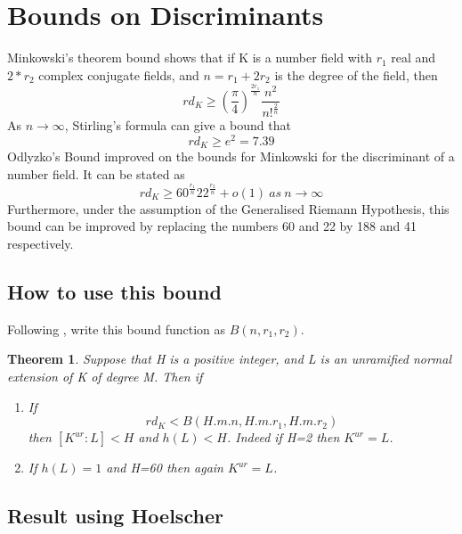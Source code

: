 \documentclass[preprint,12pt,reqno]{elsarticle}
\newtheorem{theorem}{Theorem}
\begin{document}
\section{Bounds on Discriminants}
Minkowski's theorem bound shows that if K is a number field with $r_1$ real and $2*r_2$ complex conjugate fields, and $n=r_1+2r_2$ is the degree of the field, then 
\begin{equation}
rd_K\geqslant (\frac{\pi}{4})^{\frac{2r_1}{n}}\frac{n^2}{n!^{\frac{2}{n}}}
\end{equation} 
As $n\rightarrow \infty$, Stirling's formula can give a bound that
\begin{equation}
    rd_K\geqslant e^2 = 7.39
\end{equation}
Odlyzko's Bound \cite{ODL2} improved on the bounds for Minkowski for the discriminant of a number field. It can be stated as  
\begin{equation}
rd_K\geqslant 60^{\frac{r_1}{n}}22^{\frac{r_2}{n}}+o(1)\:as\:n\rightarrow \infty   
\end{equation}
Furthermore, under the assumption of the Generalised Riemann Hypothesis, 
this bound can be improved by replacing the numbers 60 and 22 by 188 and 41 respectively. 
\subsection{How to use this bound}
Following \cite{YAMA}, write this bound function as $B(n,r_1,r_2)$.
\begin{theorem}
Suppose that H is a positive integer, and L is an unramified normal extension of K of degree M. Then if
\begin{enumerate}
    \item If \begin{equation}
        rd_K<B(H.m.n,H.m.r_1,H.m.r_2)
    \end{equation}
    then $[K^{ur}:L]<H$ and $h(L)<H$. Indeed if H=2 then $K^{ur}=L$.

    \item If
        $h(L)=1$ and H=60 then again $K^{ur}=L$.
\end{enumerate}
\end{theorem}
\subsection{Result using Hoelscher}
\end{document}
